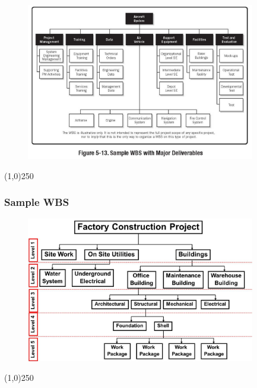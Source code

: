 \begin{frame}
\frametitle{}
\begin{figure}
	\centering
		\includegraphics[width = 10cm]{images/fig5-13.jpg}
	\label{fig:5-13}
\end{figure}
\end{frame}\begin{center}\line(1,0){250}\end{center}








\begin{frame}
\frametitle{Sample WBS}
\begin{figure}
	\centering
		\includegraphics[width = 10cm]{images/wbs.jpg}
	\label{fig:wbs}
\end{figure}
\end{frame}\begin{center}\line(1,0){250}\end{center}



